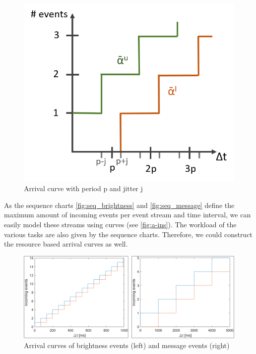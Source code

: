 \begin{figure}
    \centering
    \includegraphics[width=0.7\columnwidth]{graphics/period_with_jitter.png}
    \caption{Arrival curve with period p and jitter j}\label{fig:period_with_jitter}
\end{figure}


As the sequence charts \autoref{fig:seq_brightness} and \autoref{fig:seq_message} define the maximum amount of incoming events per event stream and time interval,
we can easily model these streams using curves (see \autoref{fig:a-ins}).
The workload of the various tasks are also given by the sequence charts.
Therefore, we could construct the resource based arrival curves as well.

\begin{figure}
    \centering
    \includegraphics[width=\columnwidth]{graphics/example_a_ins.png}
    \caption{Arrival curves of brightness events (left) and message events (right)}\label{fig:a-ins}
\end{figure}